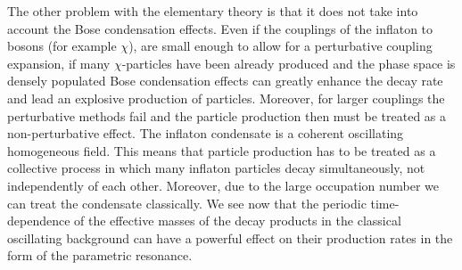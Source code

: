 \documentclass[11pt,a4paper,twoside]{book}
\begin{document}
The other problem with the elementary theory  is that it does not take into account the Bose condensation effects. Even if the couplings of the inflaton to bosons (for example $ \chi $), are small enough to allow for a perturbative coupling expansion, if many $\chi$-particles have been already produced and the phase space is densely populated Bose condensation effects can greatly enhance the decay rate and lead an explosive production of particles. Moreover, for larger couplings the perturbative methods fail and the particle production then must be treated as a non-perturbative effect. The inflaton condensate is a coherent oscillating homogeneous field. This means that particle production has to be treated as a collective process in which many inflaton particles decay simultaneously, not independently of each other. Moreover, due to the large occupation number we can treat the condensate classically. We see now that the periodic time-dependence of the effective masses of the decay products in the classical oscillating background can have a powerful effect on their production rates in the form of the parametric resonance.
\end{document}
